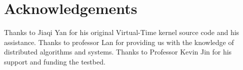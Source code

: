 \documentclass{sig-alternate-05-2015}
\begin{document}



\section{Acknowledgements}
Thanks to Jiaqi Yan for his original Virtual-Time kernel source code and his assistance. Thanks to professor Lan for providing us with the knowledge of distributed algorithms and systems. Thanks to Professor Kevin Jin for his support and funding the testbed.

%

%
%


\end{document}
